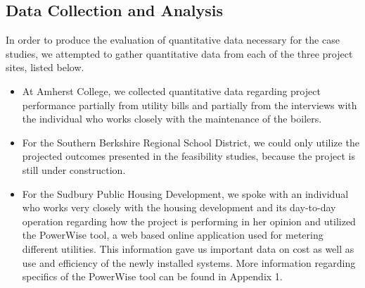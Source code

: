     \subsection{Data Collection and Analysis}
    \par In order to produce the evaluation of quantitative data necessary for the case studies, we attempted to gather quantitative data from each of the three project sites, listed below. 
   \begin{itemize}
      \item{At Amherst College, we collected quantitative data regarding project performance partially from utility bills and partially from the interviews with the individual who works closely with the maintenance of the boilers.}
      \item{For the Southern Berkshire Regional School District, we could only utilize the projected outcomes presented in the feasibility studies, because the project is still under construction.}
      \item{For the Sudbury Public Housing Development, we spoke with an individual who works very closely with the housing development and its day-to-day operation regarding how the project is performing in her opinion and utilized the PowerWise tool, a web based online application used for metering different utilities. This information gave us important data on cost as well as use and efficiency of the newly installed systems. More information regarding specifics of the PowerWise tool can be found in Appendix 1.}
    \end{itemize}

